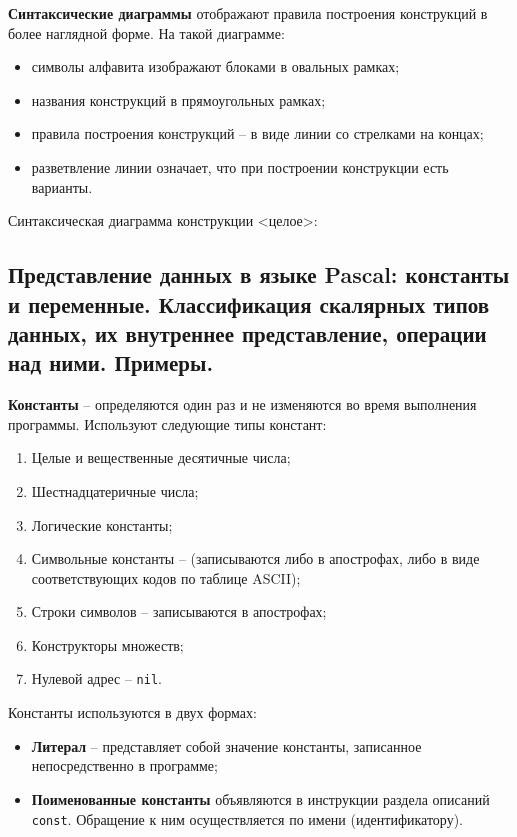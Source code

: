 {\bf{Синтаксические диаграммы}}
отображают правила построения конструкций в более наглядной форме.
На такой диаграмме:
\begin{itemize}
\item символы алфавита изображают блоками в овальных рамках;
\item названия конструкций в прямоугольных рамках;
\item правила построения конструкций – в виде линии со стрелками на концах;
\item разветвление линии означает, что при построении конструкции есть варианты. 
\end{itemize}
Синтаксическая диаграмма конструкции <целое>:


\newpage\subsection{Представление  данных  в  языке  Pascal:  константы  и  переменные.  Классификация  скалярных типов данных, их внутреннее представление, операции над ними. Примеры.} 

\begin{myquote}

\end{myquote}

{\bf{Константы}} – определяются один раз и не изменяются во время выполнения программы.
Используют следующие типы констант:
\begin{enumerate}
    \item Целые и вещественные десятичные числа;
    \item Шестнадцатеричные числа;
    \item Логические константы;
    \item Символьные константы – (записываются либо в апострофах, либо в виде соответствующих кодов по таблице ASCII);
    \item Строки символов – записываются в апострофах;
    \item Конструкторы множеств;
    \item Нулевой адрес – \texttt{nil}.
\end{enumerate}

\noindent
Константы используются в двух формах: 
\begin{itemize}
    \item {\bf{Литерал}} – представляет собой значение константы, записанное непосредственно в программе;
    \item {\bf{Поименованные константы}} объявляются в инструкции раздела описаний \texttt{const}. Обращение к ним осуществляется по имени (идентификатору).
\end{itemize}

